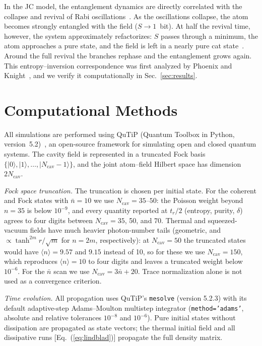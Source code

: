 \documentclass[12pt]{iopart}
\begin{document}
In the JC model, the entanglement dynamics are directly correlated with the collapse and revival of Rabi oscillations~\cite{phoenix1988}. As the oscillations collapse, the atom becomes strongly entangled with the field ($S \to 1$~bit). At half the revival time, however, the system approximately refactorizes: $S$ passes through a minimum, the atom approaches a pure state, and the field is left in a nearly pure cat state~\cite{gea-banacloche1990, phoenix1991}. Around the full revival the branches rephase and the entanglement grows again. This entropy--inversion correspondence was first analyzed by Phoenix and Knight~\cite{phoenix1988, phoenix1991}, and we verify it computationally in Sec.~\ref{sec:results}.


\section{Computational Methods}
\label{sec:methods}

All simulations are performed using QuTiP (Quantum Toolbox in Python, version~5.2)~\cite{johansson2012, johansson2013}, an open-source framework for simulating open and closed quantum systems. The cavity field is represented in a truncated Fock basis $\{|0\rangle, |1\rangle, \ldots, |N_{\text{cav}}-1\rangle\}$, and the joint atom--field Hilbert space has dimension $2N_{\text{cav}}$.

\textit{Fock space truncation.} The truncation is chosen per initial state. For the coherent and Fock states with $\bar{n} = 10$ we use $N_{\text{cav}} = 35$--$50$: the Poisson weight beyond $n = 35$ is below $10^{-9}$, and every quantity reported at $t_r/2$ (entropy, purity, $\delta$) agrees to four digits between $N_{\text{cav}} = 35$, 50, and 70. Thermal and squeezed-vacuum fields have much heavier photon-number tails (geometric, and $\propto \tanh^{2m}r/\sqrt{m}$ for $n = 2m$, respectively): at $N_{\text{cav}} = 50$ the truncated states would have $\langle n\rangle = 9.57$ and $9.15$ instead of 10, so for these we use $N_{\text{cav}} = 150$, which reproduces $\langle n\rangle = 10$ to four digits and leaves a truncated weight below $10^{-6}$. For the $\bar{n}$ scan we use $N_{\text{cav}} = 3\bar{n} + 20$. Trace normalization alone is not used as a convergence criterion.

\textit{Time evolution.} All propagation uses QuTiP's \texttt{mesolve} (version 5.2.3) with its default adaptive-step Adams--Moulton multistep integrator (\texttt{method='adams'}, absolute and relative tolerances $10^{-8}$ and $10^{-6}$). Pure initial states without dissipation are propagated as state vectors; the thermal initial field and all dissipative runs [Eq.~(\ref{eq:lindblad})] propagate the full density matrix.
\end{document}
